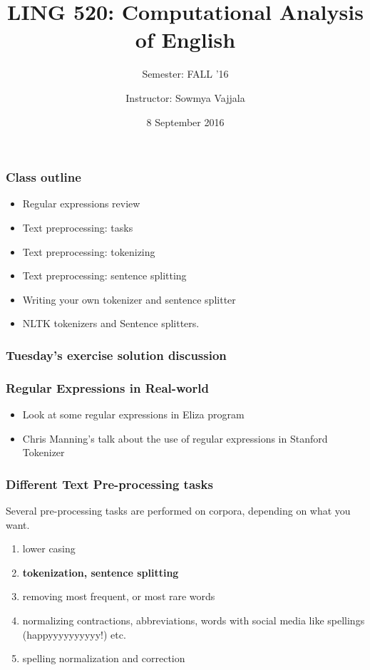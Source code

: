 \documentclass{beamer}
\author[Sowmya Vajjala]{Instructor: Sowmya Vajjala}
\title[LING 520]{LING 520: Computational Analysis of English}
\subtitle{Semester: FALL '16}
\date{8 September 2016}
\institute{Iowa State University, USA}
\begin{document}
\begin{frame}\titlepage
\end{frame}


\begin{frame}
\frametitle{Class outline}
\begin{itemize}
\item Regular expressions review
\item Text preprocessing: tasks
\item Text preprocessing: tokenizing %
\item Text preprocessing: sentence splitting %
\item Writing your own tokenizer and sentence splitter
\item NLTK tokenizers and Sentence splitters.
\end{itemize}
\end{frame}

\begin{frame}
\frametitle{Tuesday's exercise solution discussion}
\end{frame}

\begin{frame}
\frametitle{Regular Expressions in Real-world}
\begin{itemize}
\item Look at some regular expressions in Eliza program
\item Chris Manning's talk about the use of regular expressions in Stanford Tokenizer
\end{itemize}
\end{frame}

\begin{frame}
\frametitle{Different Text Pre-processing tasks}
Several pre-processing tasks are performed on corpora, depending on what you want.
\begin{enumerate}
\item lower casing
\item \textbf{tokenization, sentence splitting}
\item removing most frequent, or most rare words
\item normalizing contractions, abbreviations, words with social media like spellings (happyyyyyyyyyy!) etc.
\item spelling normalization and correction
\end{enumerate}
\end{frame}
\end{document}

